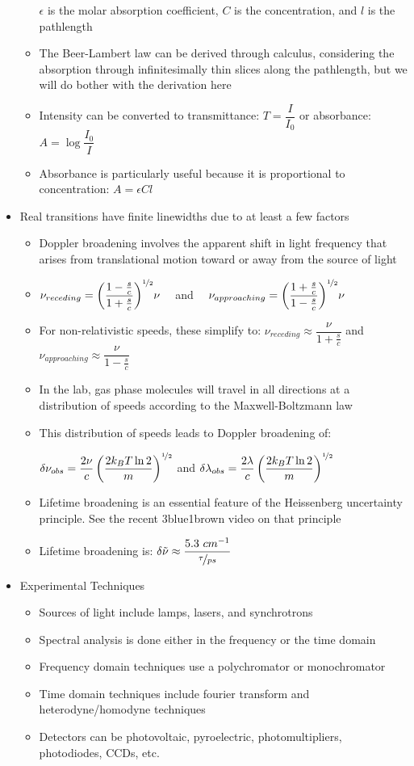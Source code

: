 \documentclass[12pt, openany, letterpaper]{memoir}
\begin{document}
\begin{itemize}
\begin{itemize}
		$\epsilon$ is the molar absorption coefficient, $C$ is the concentration, and $l$ is the pathlength
		\item The Beer-Lambert law can be derived through calculus, considering the absorption through infinitesimally thin slices along the pathlength, but we will do bother with the derivation here
		\item Intensity can be converted to transmittance: $T = \dfrac{I}{I_0}$ or absorbance: $A = \log\dfrac{I_0}{I}$
		\item Absorbance is particularly useful because it is proportional to concentration: $A=\epsilon Cl$
	\end{itemize}
	\item Real transitions have finite linewidths due to at least a few factors
	\begin{itemize}
		\item Doppler broadening involves the apparent shift in light frequency that arises from translational motion toward or away from the source of light
		\item $\nu_{receding}=\left(\dfrac{1-\frac{s}{c}}{1+\frac{s}{c}}\right)^{\nicefrac{1}{2}}\!\nu$ ~~and~~ $\nu_{approaching}=\left(\dfrac{1+\frac{s}{c}}{1-\frac{s}{c}}\right)^{\nicefrac{1}{2}}\!\nu$
		\item For non-relativistic speeds, these simplify to: $\nu_{receding}\approx \dfrac{\nu}{1+\frac{s}{c}}$ and $\nu_{approaching}\approx \dfrac{\nu}{1-\frac{s}{c}}$
		\item In the lab, gas phase molecules will travel in all directions at a distribution of speeds according to the Maxwell-Boltzmann law
		\item This distribution of speeds leads to Doppler broadening of:
		
		$\delta\nu_{obs}=\dfrac{2\nu}{c}\left(\dfrac{2k_BT\ln 2}{m}\right)^{\nicefrac{1}{2}}$ and $\delta\lambda_{obs}=\dfrac{2\lambda}{c}\left(\dfrac{2k_BT\ln 2}{m}\right)^{\nicefrac{1}{2}}$
		\item Lifetime broadening is an essential feature of the Heissenberg uncertainty principle. See the recent 3blue1brown video on that principle
		\item Lifetime broadening is: $\delta \tilde{\nu}\approx \dfrac{5.3~cm^{-1}}{\nicefrac{\tau}{ps}}$
	\end{itemize}
	\item Experimental Techniques
	\begin{itemize}
		\item Sources of light include lamps, lasers, and synchrotrons
		\item Spectral analysis is done either in the frequency or the time domain
		\item Frequency domain techniques use a polychromator or monochromator
		\item Time domain techniques include fourier transform and heterodyne/homodyne techniques
		\item Detectors can be photovoltaic, pyroelectric, photomultipliers, photodiodes, CCDs, etc.
	\end{itemize}
\end{itemize}
\end{document}
